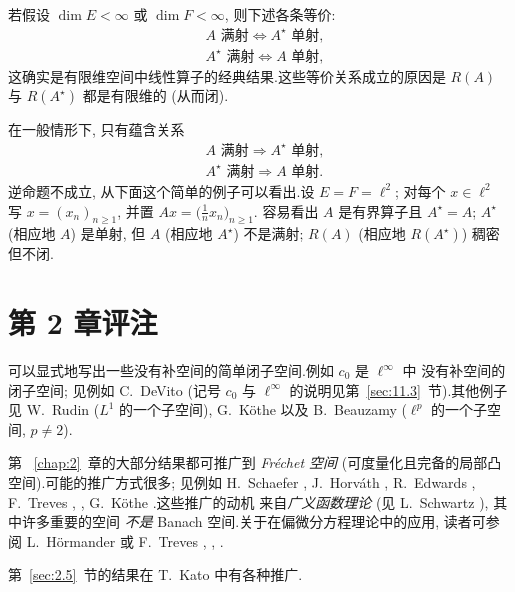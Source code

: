 \begin{remark}
\label{rem:2.20}
若假设 $\dim E<\infty$ 或 $\dim F<\infty$, 则下述各条等价:
\begin{align*}
&A \text{ 满射} \Longleftrightarrow A^\star \text{ 单射},\\
&A^\star \text{ 满射} \Longleftrightarrow A \text{ 单射},
\end{align*}
这确实是有限维空间中线性算子的经典结果.这些等价关系成立的原因是 $R(A)$ 与
$R(A^\star)$ 都是有限维的 (从而闭).

在一般情形下, 只有蕴含关系
\begin{align*}
&A \text{ 满射} \Rightarrow A^\star \text{ 单射},\\
&A^\star \text{ 满射} \Rightarrow A \text{ 单射}.
\end{align*}
逆命题不成立, 从下面这个简单的例子可以看出.设 $E=F=\ell^2$; 对每个
$x\in\ell^2$ 写 $x=(x_n)_{n\ge1}$, 并置 $Ax=\bigl(\frac1n x_n\bigr)_{n\ge1}$.
容易看出 $A$ 是有界算子且 $A^\star=A$; $A^\star$ (相应地 $A$) 是单射, 但 $A$
(相应地 $A^\star$) 不是满射; $R(A)$ (相应地 $R(A^\star)$) 稠密但不闭.
\end{remark}

\section*{第 2 章评注}

可以显式地写出一些没有补空间的简单闭子空间.例如 $c_0$ 是 $\ell^\infty$ 中
没有补空间的闭子空间; 见例如 C.~DeVito  (记号 $c_0$ 与
$\ell^\infty$ 的说明见第~\ref{sec:11.3}~节).其他例子见 W.~Rudin  ($L^1$
的一个子空间), G.~Köthe  以及 B.~Beauzamy 
($\ell^p$ 的一个子空间, $p\ne2$).

第~
\ref{chap:2}~章的大部分结果都可推广到 \emph{Fréchet 空间} (可度量化且完备的局部凸
空间).可能的推广方式很多; 见例如 H.~Schaefer , J.~Horváth , R.~Edwards , F.~Treves
, , G.~Köthe .这些推广的动机
来自\emph{广义函数理论} (见 L.~Schwartz ), 其中许多重要的空间
\emph{不是} Banach 空间.关于在偏微分方程理论中的应用, 读者可参阅
L.~Hörmander  或 F.~Treves , ,
.

第~\ref{sec:2.5}~节的结果在 T.~Kato  中有各种推广.


